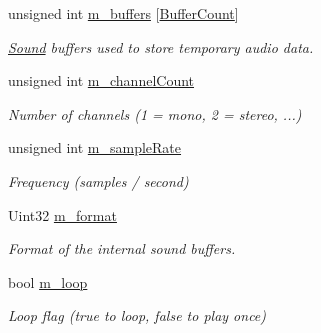 \begin{DoxyCompactItemize}
\mbox{\label{classsf_1_1_sound_stream_a3a7fbefda7d08527177acd1f6e63487b}} 
unsigned int \mbox{\hyperlink{classsf_1_1_sound_stream_a3a7fbefda7d08527177acd1f6e63487b}{m\+\_\+buffers}} \mbox{[}\mbox{\hyperlink{classsf_1_1_sound_stream_a2419ce94e45f7d4d0302b7963282c40ca3adf3b6cd18edb6121fda81e569dbbf5}{Buffer\+Count}}\mbox{]}
\begin{DoxyCompactList}\small\item\em \mbox{\hyperlink{classsf_1_1_sound}{Sound}} buffers used to store temporary audio data. \end{DoxyCompactList}\item 
\mbox{\label{classsf_1_1_sound_stream_ad7c1a66f24be5e58ed275fd06e24294e}} 
unsigned int \mbox{\hyperlink{classsf_1_1_sound_stream_ad7c1a66f24be5e58ed275fd06e24294e}{m\+\_\+channel\+Count}}
\begin{DoxyCompactList}\small\item\em Number of channels (1 = mono, 2 = stereo, ...) \end{DoxyCompactList}\item 
\mbox{\label{classsf_1_1_sound_stream_ac6cf65793e01b6b5f6bf6b555b1c1dfd}} 
unsigned int \mbox{\hyperlink{classsf_1_1_sound_stream_ac6cf65793e01b6b5f6bf6b555b1c1dfd}{m\+\_\+sample\+Rate}}
\begin{DoxyCompactList}\small\item\em Frequency (samples / second) \end{DoxyCompactList}\item 
\mbox{\label{classsf_1_1_sound_stream_a5c91434e0f1c2e4445e01b3de578af49}} 
Uint32 \mbox{\hyperlink{classsf_1_1_sound_stream_a5c91434e0f1c2e4445e01b3de578af49}{m\+\_\+format}}
\begin{DoxyCompactList}\small\item\em Format of the internal sound buffers. \end{DoxyCompactList}\item 
\mbox{\label{classsf_1_1_sound_stream_a32ee01b984f74c9e0857d676bc33ad9f}} 
bool \mbox{\hyperlink{classsf_1_1_sound_stream_a32ee01b984f74c9e0857d676bc33ad9f}{m\+\_\+loop}}
\begin{DoxyCompactList}\small\item\em Loop flag (true to loop, false to play once) \end{DoxyCompactList}\item 

\end{DoxyCompactItemize}
